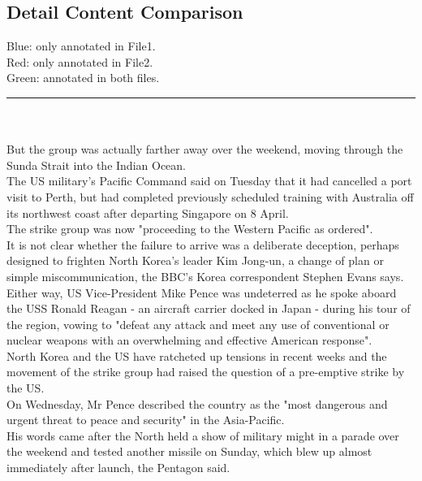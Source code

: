 \documentclass[runningheads,a4paper]{llncs}
\begin{document}
\begin{CJK*}{UTF8}{gbsn}
\section{Detail Content Comparison}
\colorbox{blue!30}{Blue}: only annotated in File1.\\
\colorbox{red!30}{Red}: only annotated in File2.\\
\colorbox{green!30}{Green}: annotated in both files.\\
\rule{5cm}{0.1em}\\
\vspace{0.3cm}\\
But the group was actually farther away over the weekend, moving through \colorbox{blue!30}{the }\colorbox{green!30}{Sunda Strait} into the \colorbox{red!30}{Indian Ocean}.\\
The \colorbox{green!30}{US} military's \colorbox{blue!30}{Pacific }\colorbox{green!30}{Command} said on Tuesday that it had cancelled a port visit to\colorbox{red!30}{ }\colorbox{green!30}{Perth}, but had completed previously scheduled training with \colorbox{blue!30}{Australia} off its northwest coast after departing \colorbox{green!30}{Singapore} on 8 April.\\
The strike group was now "proceeding to \colorbox{blue!30}{the Western Pacific} as ordered".\\
It is not clear whether the failure to arrive was a deliberate deception, perhaps designed to frighten North Korea's leader \colorbox{red!30}{Kim Jong-un}, a change of plan or simple miscommunication, the \colorbox{red!30}{BBC's Korea correspondent Stephen Evans} says.\\
Either way, US Vice-President Mike Pence was undeterred as he spoke aboard the USS Ronald Reagan - an aircraft carrier docked in Japan - during his tour of the region, vowing to "defeat any attack and meet any use of conventional or nuclear weapons with an overwhelming and effective American response".\\
North Korea and the US have ratcheted up tensions in recent weeks and the movement of the strike group had raised the question of a pre-emptive strike by the US.\\
On Wednesday, Mr Pence described the country as the "most dangerous and urgent threat to peace and security" in the Asia-Pacific.\\
His words came after the North held a show of military might in a parade over the weekend and tested another missile on Sunday, which blew up almost immediately after launch, the Pentagon said.\\

\end{CJK*}
\end{document}
